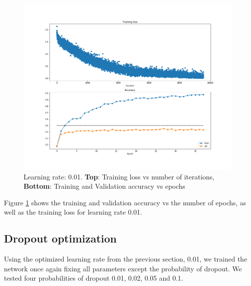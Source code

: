 \documentclass[12pt,twoside]{article}
\begin{document}
\begin{figure}[!htbp]
\centering %
\includegraphics[width = 1\hsize]{./figures/l_rate_0_01.png} %
\caption{Learning rate: 0.01. \textbf{Top}: Training loss vs number of iterations, \textbf{Bottom}: Training and Validation accuracy vs epochs} %
\label{lrate0_01}
\end{figure}

Figure \ref{lrate0_01} shows the training and validation accuracy vs the number of epochs, as well as the training loss for learning rate 0.01.

\subsection{Dropout optimization}

Using the optimized learning rate from the previous section, 0.01, we trained the network once again fixing all parameters except the probability of dropout. We tested four probabilities of dropout 0.01, 0.02, 0.05 and 0.1. 
\end{document}
